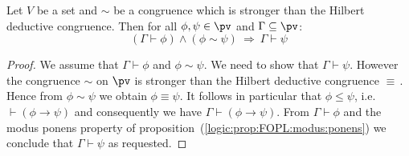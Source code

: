 \begin{prop}\label{logic:prop:FOPL:HDC:sequent:stronger:congruence}
Let $V$ be a set and $\sim$ be a congruence which is stronger than
the Hilbert deductive congruence. Then for all $\phi,\psi\in\pv$ and
$\Gamma\subseteq\pv$:
    \[
    (\Gamma\vdash\phi)\land(\phi\sim\psi)\ \Rightarrow\
    \Gamma\vdash\psi
    \]
\end{prop}
\begin{proof}
We assume that $\Gamma\vdash\phi$ and $\phi\sim\psi$. We need to
show that $\Gamma\vdash\psi$. However the congruence $\sim$ on $\pv$
is stronger than the Hilbert deductive congruence $\equiv$\,. Hence
from $\phi\sim\psi$ we obtain $\phi\equiv\psi$. It follows in
particular that $\phi\leq\psi$, i.e. $\vdash(\phi\to\psi)$ and
consequently we have $\Gamma\vdash(\phi\to\psi)$. From
$\Gamma\vdash\phi$ and the modus ponens property of
proposition~(\ref{logic:prop:FOPL:modus:ponens}) we conclude that
$\Gamma\vdash\psi$ as requested.
\end{proof}
